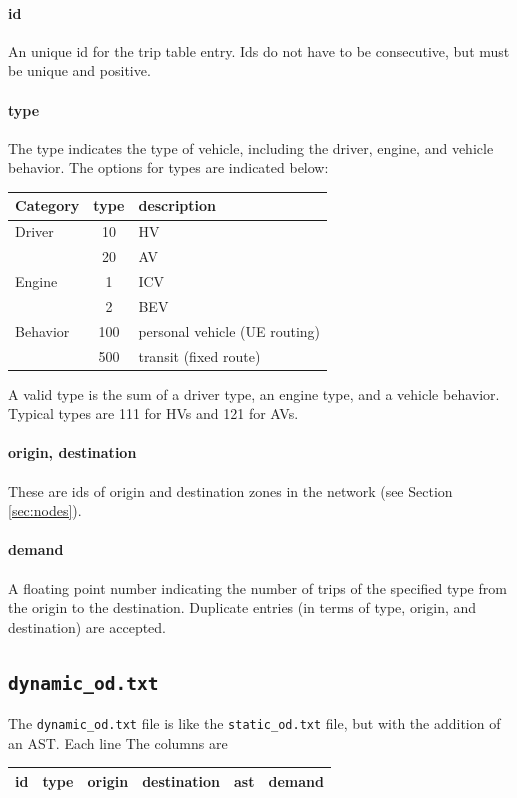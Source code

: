 \paragraph*{id} An unique id for the trip table entry. Ids do not have to be consecutive, but must be unique and positive.
\paragraph*{type} The type indicates the type of vehicle, including the driver, engine, and vehicle behavior. The options for types are indicated below:
\begin{center}
\begin{tabular}{lcl}
\hline
Category & type & description \\\hline
Driver & 10 & HV \\
 & 20 & AV\\\hline
Engine & 1 & ICV \\
& 2 & BEV\\\hline
Behavior & 100 & personal vehicle (UE routing)\\
& 500 & transit (fixed route)\\\hline
\end{tabular}
\end{center}
A valid type is the sum of a driver type, an engine type, and a vehicle behavior. Typical types are 111 for HVs and 121 for AVs.

\paragraph*{origin, destination} These are ids of origin and destination zones in the network (see Section \ref{sec:nodes}).
\paragraph*{demand} A floating point number indicating the number of trips of the specified type from the origin to the destination. Duplicate entries (in terms of type, origin, and destination) are accepted.

\subsection{\texttt{dynamic\_od.txt}}
\label{sec:dynamicod}

The \texttt{dynamic\_od.txt} file is like the \texttt{static\_od.txt} file, but with the addition of an AST. Each line The columns are
\begin{center}
\begin{tabular}{cccccc}
\hline
id & type & origin & destination & ast & demand\\\hline
\end{tabular}
\end{center}
